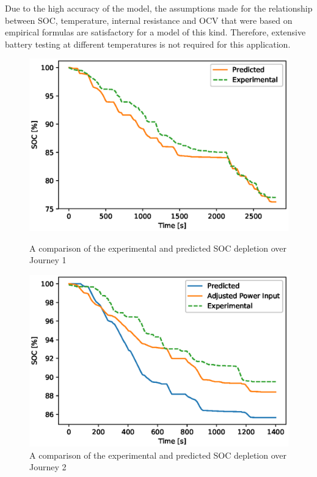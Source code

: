\documentclass[a4paper, 10pt]{article}
\numberwithin{equation}{section}
\begin{document}
Due to the high accuracy of the model, the assumptions made for the relationship between SOC, temperature, internal resistance and OCV that were based on empirical formulas are satisfactory for a model of this kind. Therefore, extensive battery testing at different temperatures is not required for this application.

\begin{figure}[H]
\centering
\begin{minipage}{.5\textwidth}
  \centering
    \includegraphics[width=\textwidth]{images/val_soc_2.eps}
    \caption{A comparison of the experimental and predicted SOC depletion over Journey 1}
    \label{fig:val_soc_1}
\end{minipage}%
\begin{minipage}{.5\textwidth}
  \centering
    \includegraphics[width=\textwidth]{images/ride2_val_soc.eps}
    \caption{A comparison of the experimental and predicted SOC depletion over Journey 2}
    \label{fig:val_soc_2}
\end{minipage}
\end{figure}
\end{document}
